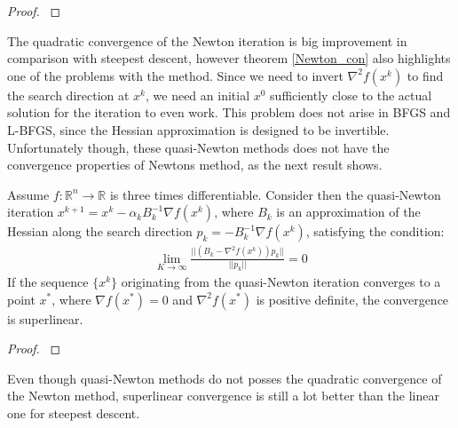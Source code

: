 \begin{proof}
\cite{nocedal2006numerical}
\end{proof}
\noindent
The quadratic convergence of the Newton iteration is big improvement in comparison with steepest descent, however theorem \ref{Newton_con} also highlights one of the problems with the method. Since we need to invert $\nabla^2 f(x^k)$ to find the search direction at $x^k$, we need an initial $x^0$ sufficiently close to the actual solution for the iteration to even work. This problem does not arise in BFGS and L-BFGS, since the Hessian approximation is designed to be invertible. Unfortunately though, these quasi-Newton methods does not have the convergence properties of Newtons method, as the next result shows.
\begin{theorem}
Assume $f:\mathbb{R}^n\rightarrow\mathbb{R}$ is three times differentiable. Consider then the quasi-Newton iteration $x^{k+1}=x^k-\alpha_k B_k^{-1}\nabla f(x^k)$, where $B_k$ is an approximation of the Hessian along the search direction $p_k=-B_k^{-1}\nabla f(x^k)$, satisfying the condition:
\begin{align*}
\lim_{K\rightarrow\infty}\frac{||(B_k-\nabla^2f(x^k))p_k||}{||p_k||}=0
\end{align*}
If the sequence $\{x^k\}$ originating from the quasi-Newton iteration converges to a point $x^*$, where $\nabla f(x^*)=0$ and $\nabla^2 f(x^*)$ is positive definite, the convergence is superlinear. 
\end{theorem} 
\begin{proof}
\cite{nocedal2006numerical}
\end{proof}
\noindent
Even though quasi-Newton methods do not posses the quadratic convergence of the Newton method, superlinear convergence is still a lot better than the linear one for steepest descent.